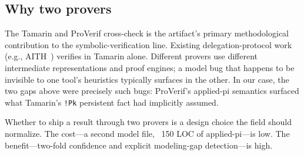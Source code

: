 \subsection{Why two provers}

The Tamarin and ProVerif cross-check is the artifact's primary
methodological contribution to the symbolic-verification line.
Existing delegation-protocol work (e.g., AITH~\cite{chen2026aith})
verifies in Tamarin alone.  Different provers use different
intermediate representations and proof engines; a model bug that
happens to be invisible to one tool's heuristics typically surfaces
in the other.  In our case, the two gaps above were precisely such
bugs: ProVerif's applied-pi semantics surfaced what Tamarin's
\texttt{!Pk} persistent fact had implicitly assumed.

Whether to ship a result through two provers is a design choice
the field should normalize.  The cost---a second model file, ~150
LOC of applied-pi---is low.  The benefit---two-fold confidence and
explicit modeling-gap detection---is high.

